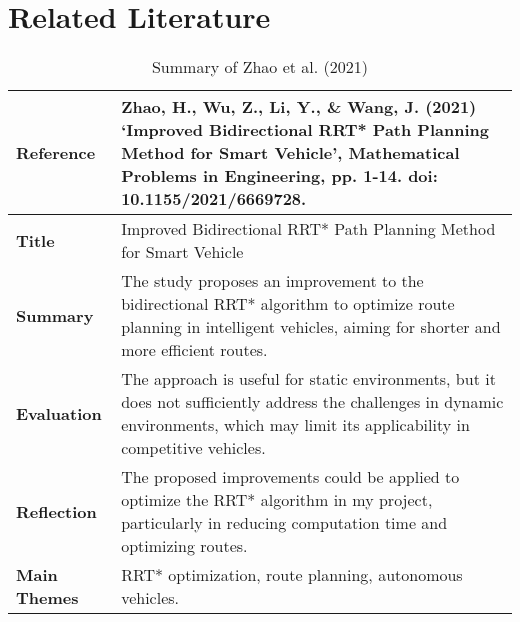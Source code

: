 \documentclass[a4paper,11pt]{report}
\begin{document}
\section{Related Literature}

\begin{table}[H]
    \centering
    \begin{tabular}{|p{3cm}|p{10cm}|}
        \hline
        \textbf{Reference} & Zhao, H., Wu, Z., Li, Y., \& Wang, J. (2021) ‘Improved Bidirectional RRT* Path Planning Method for Smart Vehicle’, Mathematical Problems in Engineering, pp. 1-14. doi: 10.1155/2021/6669728. \\ \hline
        \textbf{Title} & Improved Bidirectional RRT* Path Planning Method for Smart Vehicle \\ \hline
        \textbf{Summary} & The study proposes an improvement to the bidirectional RRT* algorithm to optimize route planning in intelligent vehicles, aiming for shorter and more efficient routes. \\ \hline
        \textbf{Evaluation} & The approach is useful for static environments, but it does not sufficiently address the challenges in dynamic environments, which may limit its applicability in competitive vehicles. \\ \hline
        \textbf{Reflection} & The proposed improvements could be applied to optimize the RRT* algorithm in my project, particularly in reducing computation time and optimizing routes. \\ \hline
        \textbf{Main Themes} & RRT* optimization, route planning, autonomous vehicles. \\ \hline
    \end{tabular}
    \caption{Summary of Zhao et al. (2021)}
    \label{tab:zhao2021}
\end{table}
\end{document}
